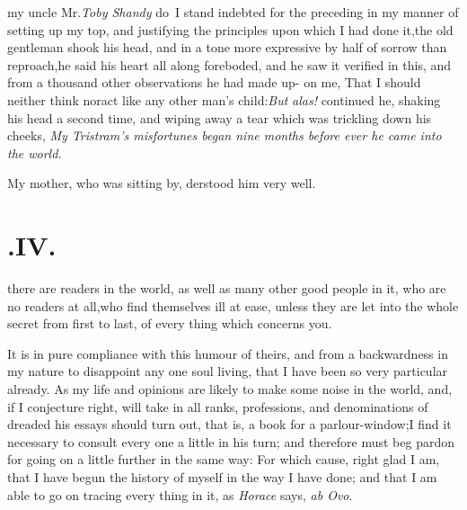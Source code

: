 \documentclass{article}
\begin{document}
 my uncle Mr.\@ \textit{Toby Shandy} do~I\break
stand indebted for the preceding\break
{}
\break
in my manner of
setting up my top, and justifying the principles upon which I had
done it,\tsk  the old gentleman shook his head, and in a tone more
expressive by half of sorrow than reproach,\tsk  he said his heart
all along foreboded, and he saw it verified in this, and from a
thousand other observations he had made up- on me, That I should
neither think nor\break act like any other man’s
child:\tsh  \textit{But} \textit{alas!} continued he, shaking his head a
second time, and wiping away a tear which was trickling down his
cheeks, \textit{My Tristram’s misfortunes began nine months before
ever he came into the world.}

\tsh My mother, who was sitting by,\break
{}
derstood him very well.

\null
\section{.\enspace IV.}

 there are readers in the
world, as well as many other good people in it, who are no readers
at all,\tsk  who find themselves ill at ease, unless they are let
into the whole secret from first to last, of every thing which
concerns you.

It is in pure compliance with this humour of theirs, and from a
backwardness in my nature to disappoint any one soul living, that I
have been so very particular already. As my life and opinions are
likely to make some noise in the world, and, if I conjecture right,
will take in all ranks, professions, and denominations of 
dreaded his essays should turn out, that is,
a book for a parlour-window;\tsk  I find it necessary to consult
every one a little in his turn; and therefore must beg pardon for going on a little
further in the same way:
For which cause, right glad I am, that I have begun the history of
myself in the way I have done; and that I am able to go on tracing
every thing in it, as \textit{Horace} says, \textit{ab Ovo}.
\end{document}
